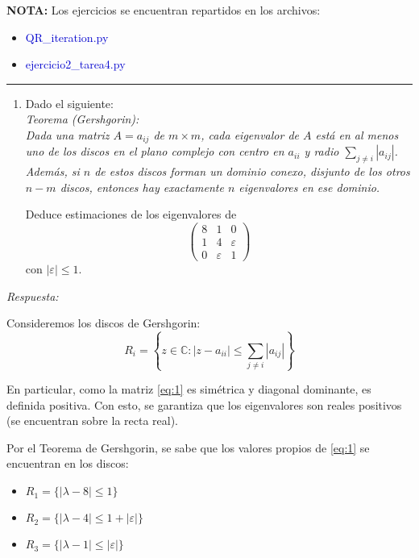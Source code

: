 \textcolor{BrickRed}{\bf NOTA:}  Los ejercicios se encuentran repartidos en los archivos:
\begin{itemize}
	\item \textcolor{mediumblue}{QR\_iteration.py}
	\item \textcolor{mediumblue}{ejercicio2\_tarea4.py}
\end{itemize}

\vspace{5mm}
{\color{lightgray} \hrule}
\begin{enumerate}
	\item Dado el siguiente:\\
	\textit{Teorema (Gershgorin):}\\
	\textit{Dada una matriz $A=a_{ij}$ de $m\times m$, cada eigenvalor de $A$ está en al menos uno de los discos en el plano complejo con centro en $a_{ii}$ y radio $\sum_{j\neq i} \left|a_{ij}\right|$. Además, si $n$ de estos discos forman un dominio conexo, disjunto de los otros $n-m$ discos, entonces hay exactamente $n$ eigenvalores en ese dominio.}
	
	Deduce estimaciones de los eigenvalores de
	\begin{equation} \label{eq:1}
		\begin{pmatrix}
			8 & 1 & 0\\
			1 & 4 & \varepsilon\\
			0 & \varepsilon & 1
		\end{pmatrix}
	\end{equation}
	con $\left|\varepsilon\right| \leq 1$.
	
\end{enumerate}

\textcolor{BrickRed}{\it Respuesta:}

Consideremos los discos de Gershgorin:
\begin{equation} \label{eq:2}
	R_{i} = \left\{z\in \mathbb{C} : \left| z - a_{ii} \right| \leq \sum_{j\neq i} \left|a_{ij}\right| \right\}
\end{equation}

En particular, como la matriz \eqref{eq:1} es simétrica y diagonal dominante, es definida positiva. Con esto, se garantiza que los eigenvalores son reales positivos (se encuentran sobre la recta real).

Por el Teorema de Gershgorin, se sabe que los valores propios de \eqref{eq:1} se encuentran en los discos:
\begin{itemize}
	\item $R_{1} = \{\left|\lambda-8\right| \leq 1\}$
	\item $R_{2} = \{\left|\lambda-4\right| \leq 1+\left| \varepsilon\right| \}$
	\item $R_{3} = \{\left|\lambda-1\right| \leq \left|\varepsilon\right|\}$
\end{itemize}

